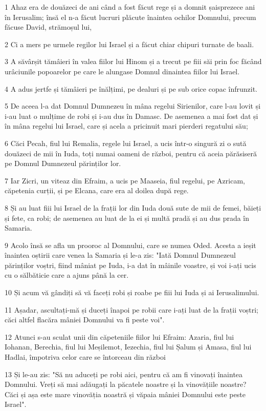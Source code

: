 \par 1 Ahaz era de douăzeci de ani când a fost făcut rege și a domnit șaisprezece ani în Ierusalim; însă el n-a făcut lucruri plăcute înaintea ochilor Domnului, precum făcuse David, strămoșul lui,
\par 2 Ci a mers pe urmele regilor lui Israel și a făcut chiar chipuri turnate de baali.
\par 3 A săvârșit tămâieri în valea fiilor lui Hinom și a trecut pe fiii săi prin foc făcând urâciunile popoarelor pe care le alungase Domnul dinaintea fiilor lui Israel.
\par 4 A adus jertfe și tămâieri pe înălțimi, pe dealuri și pe sub orice copac înfrunzit.
\par 5 De aceea l-a dat Domnul Dumnezeu în mâna regelui Sirienilor, care l-au lovit și i-au luat o mulțime de robi și i-au dus în Damasc. De asemenea a mai fost dat și în mâna regelui lui Israel, care și acela a pricinuit mari pierderi regatului său;
\par 6 Căci Pecah, fiul lui Remalia, regele lui Israel, a ucis într-o singură zi o sută douăzeci de mii în Iuda, toți numai oameni de război, pentru că aceia părăsiseră pe Domnul Dumnezeul părinților lor.
\par 7 Iar Zicri, un viteaz din Efraim, a ucis pe Maaseia, fiul regelui, pe Azricam, căpetenia curții, și pe Elcana, care era al doilea după rege.
\par 8 Și au luat fiii lui Israel de la frații lor din Iuda două sute de mii de femei, băieți și fete, ca robi; de asemenea au luat de la ei și multă pradă și au dus prada în Samaria.
\par 9 Acolo însă se afla un prooroc al Domnului, care se numea Oded. Acesta a ieșit înaintea oștirii care venea la Samaria și le-a zis: "Iată Domnul Dumnezeul părinților voștri, fiind mâniat pe Iuda, i-a dat în mâinile voastre, și voi i-ați ucis cu o sălbăticie care a ajuns până la cer.
\par 10 Și acum vă gândiți să vă faceți robi și roabe pe fiii lui Iuda și ai Ierusalimului.
\par 11 Așadar, ascultați-mă și duceți înapoi pe robii care i-ați luat de la frații voștri; căci altfel flacăra mâniei Domnului va fi peste voi".
\par 12 Atunci s-au sculat unii din căpeteniile fiilor lui Efraim: Azaria, fiul lui Iohanan, Berechia, fiul lui Meșilemot, Iezechia, fiul lui Șalum și Amasa, fiul lui Hadlai, împotriva celor care se întorceau din război
\par 13 Și le-au zis: "Să nu aduceți pe robi aici, pentru că am fi vinovați înaintea Domnului. Vreți să mai adăugați la păcatele noastre și la vinovățiile noastre? Căci și așa este mare vinovăția noastră și văpaia mâniei Domnului este peste Israel".
